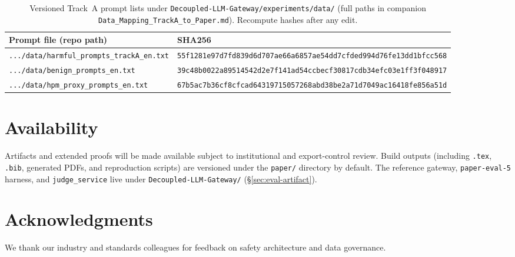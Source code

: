 \documentclass[letterpaper,twocolumn,10pt]{article}
\begin{document}
\begin{table}[t]
\centering
\small
\begin{tabular}{@{}ll@{}}
\toprule
\textbf{Prompt file (repo path)} & \textbf{SHA256} \\
\midrule
\texttt{.../data/harmful\_prompts\_trackA\_en.txt} & \texttt{55f1281e97d7fd839d6d707ae66a6857ae54dd7cfded994d76fe13dd1bfcc568} \\
\texttt{.../data/benign\_prompts\_en.txt} & \texttt{39c48b0022a89514542d2e7f141ad54ccbecf30817cdb34efc03e1ff3f048917} \\
\texttt{.../data/hpm\_proxy\_prompts\_en.txt} & \texttt{67b5ac7b36cf8cfcad64319715057268abd38be2a71d7049ac16418fe856a51d} \\
\bottomrule
\end{tabular}
\caption{Versioned Track~A prompt lists under \texttt{Decoupled-LLM-Gateway/experiments/data/} (full paths in companion \texttt{Data\_Mapping\_TrackA\_to\_Paper.md}). Recompute hashes after any edit.}
\label{tab:prompt-sha}
\end{table}

\section*{Availability}
Artifacts and extended proofs will be made available subject to institutional and export-control review. Build outputs (including \texttt{.tex}, \texttt{.bib}, generated PDFs, and reproduction scripts) are versioned under the \texttt{paper/} directory by default. The reference gateway, \texttt{paper-eval-5} harness, and \texttt{judge\_service} live under \texttt{Decoupled-LLM-Gateway/} (\S\ref{sec:eval-artifact}).

\section*{Acknowledgments}
We thank our industry and standards colleagues for feedback on safety architecture and data governance.



\end{document}
